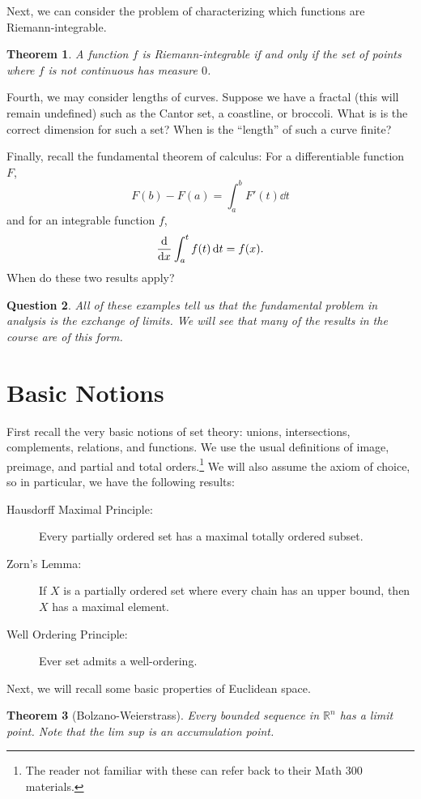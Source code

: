 \documentclass[leqno, openany]{memoir}
\newtheorem{thm}{Theorem}[chapter]
\newtheorem{quest}[thm]{Question}
\theoremstyle{definition}
\theoremstyle{remark}
\theoremstyle{plain}
\theoremstyle{definition}
\theoremstyle{remark}
\newcommand{\R}{\mathbb{R}}
\begin{document}
Next, we can consider the problem of characterizing which functions are
Riemann-integrable.

\begin{thm} A function $f$ is Riemann-integrable if and only if the set of
points where $f$ is not continuous has measure $0$.  \end{thm}

Fourth, we may consider lengths of curves. Suppose we have a fractal (this will
remain undefined) such as the Cantor set, a coastline, or broccoli. What is is
the correct dimension for such a set? When is the ``length'' of such a curve
finite?

Finally, recall the fundamental theorem of calculus: For a differentiable
function $F$, \[ F(b) - F(a) = \int_a^b F'(t) \dd{t} \] and for an integrable
function $f$, \[ \dv{x} \int_a^t f(t) \dd{t} = f(x). \] When do these two
results apply?

\begin{quest} All of these examples tell us that the fundamental problem in
analysis is the exchange of limits. We will see that many of the results in the
course are of this form.  \end{quest}

\section{Basic Notions}%

First recall the very basic notions of set theory: unions, intersections,
complements, relations, and functions. We use the usual definitions of image,
preimage, and partial and total orders.\footnote{The reader not familiar with
these can refer back to their Math 300 materials.} We will also assume the
axiom of choice, so in particular, we have the following results:
\begin{description} \item[Hausdorff Maximal Principle:] Every partially ordered
    set has a maximal totally ordered subset.  \item[Zorn's Lemma:] If $X$ is a
    partially ordered set where every chain has an upper bound, then $X$ has a
    maximal element.  \item[Well Ordering Principle:] Ever set admits a
    well-ordering.  \end{description}

Next, we will recall some basic properties of Euclidean space.

\begin{thm}[Bolzano-Weierstrass] Every bounded sequence in $\R^n$ has a limit
point. Note that the lim sup is an accumulation point.  \end{thm}
\end{document}
